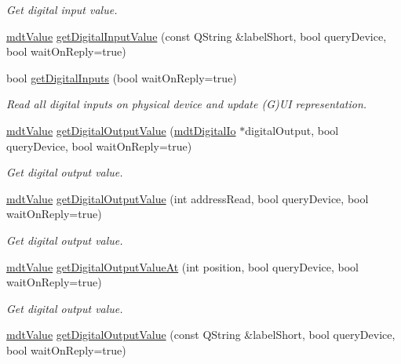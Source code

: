 \begin{DoxyCompactItemize}
\begin{DoxyCompactList}\small\item\em Get digital input value. \end{DoxyCompactList}\item 
\hyperlink{classmdt_value}{mdt\-Value} \hyperlink{classmdt_multi_io_device_af91f46d23f2ae65646291a52f7de4e29}{get\-Digital\-Input\-Value} (const Q\-String \&label\-Short, bool query\-Device, bool wait\-On\-Reply=true)
\item 
bool \hyperlink{classmdt_multi_io_device_a18d95fd68e45f11397f1ebf7fb7a0a0a}{get\-Digital\-Inputs} (bool wait\-On\-Reply=true)
\begin{DoxyCompactList}\small\item\em Read all digital inputs on physical device and update (G)U\-I representation. \end{DoxyCompactList}\item 
\hyperlink{classmdt_value}{mdt\-Value} \hyperlink{classmdt_multi_io_device_a9c32969bf05be92b0196fec82f94c49d}{get\-Digital\-Output\-Value} (\hyperlink{classmdt_digital_io}{mdt\-Digital\-Io} $\ast$digital\-Output, bool query\-Device, bool wait\-On\-Reply=true)
\begin{DoxyCompactList}\small\item\em Get digital output value. \end{DoxyCompactList}\item 
\hyperlink{classmdt_value}{mdt\-Value} \hyperlink{classmdt_multi_io_device_adc21430048799eb55bff16e0767fd514}{get\-Digital\-Output\-Value} (int address\-Read, bool query\-Device, bool wait\-On\-Reply=true)
\begin{DoxyCompactList}\small\item\em Get digital output value. \end{DoxyCompactList}\item 
\hyperlink{classmdt_value}{mdt\-Value} \hyperlink{classmdt_multi_io_device_a19a09fe9327128e8805f10ece79ef0e4}{get\-Digital\-Output\-Value\-At} (int position, bool query\-Device, bool wait\-On\-Reply=true)
\begin{DoxyCompactList}\small\item\em Get digital output value. \end{DoxyCompactList}\item 
\hyperlink{classmdt_value}{mdt\-Value} \hyperlink{classmdt_multi_io_device_ac321fb0cdd655881cfd60706a304857e}{get\-Digital\-Output\-Value} (const Q\-String \&label\-Short, bool query\-Device, bool wait\-On\-Reply=true)
\item 

\end{DoxyCompactItemize}
